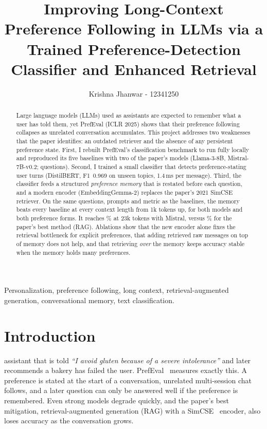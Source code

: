 \documentclass[lettersize,journal]{IEEEtran}
\begin{document}
\title{Improving Long-Context Preference Following in LLMs via a Trained Preference-Detection Classifier and Enhanced Retrieval}

\author{Krishna Jhanwar - 12341250}

\maketitle

\begin{abstract}
Large language models (LLMs) used as assistants are expected to remember what a user has told them, yet PrefEval (ICLR 2025) shows
that their preference following collapses as unrelated conversation accumulates. This project addresses two weaknesses that the paper
identifies: an outdated retriever and the absence of any persistent preference state. First, I rebuilt PrefEval's classification
benchmark to run fully locally and reproduced its five baselines with two of the paper's models (Llama-3-8B, Mistral-7B-v0.2;
\nQuestions{} questions). Second, I trained a small classifier that detects preference-stating user turns (DistilBERT, F1~0.969 on unseen
topics, 1.4\,ms per message). Third, the classifier feeds a structured \emph{preference memory} that is restated before each question,
and a modern encoder (EmbeddingGemma-2) replaces the paper's 2021 SimCSE retriever. On the same questions, prompts and metric as the baselines,
the memory beats every baseline at every context length from 1k tokens up, for both models and both preference forms. It reaches
\qMiMemTwentyThree\% at 23k tokens with Mistral, versus \qMiRagTwentyThree\% for the paper's best method (RAG). Ablations show that the new encoder
alone fixes the retrieval bottleneck for explicit preferences, that adding retrieved raw messages on top of memory does not help, and that
retrieving \emph{over} the memory keeps accuracy stable when the memory holds many preferences.
\end{abstract}

\begin{IEEEkeywords}
Personalization, preference following, long context, retrieval-augmented generation, conversational memory, text classification.
\end{IEEEkeywords}

\section{Introduction}
 assistant that is told \emph{``I avoid gluten because of a severe intolerance''} and later recommends a bakery has
failed the user. PrefEval~\cite{prefeval} measures exactly this. A preference is stated at the start of a conversation, unrelated
multi-session chat follows, and a later question can only be answered well if the preference is remembered. Even strong models degrade
quickly, and the paper's best mitigation, retrieval-augmented generation (RAG) with a SimCSE~\cite{simcse} encoder, also loses accuracy as the
conversation grows.
\end{document}
